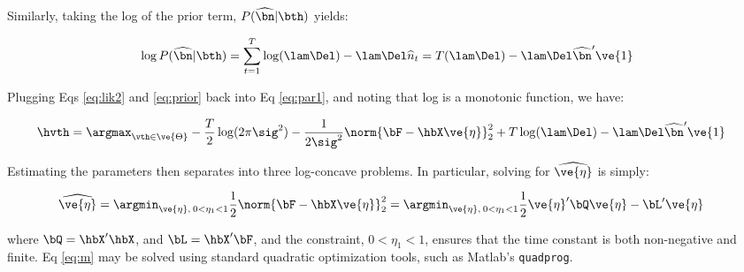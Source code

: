 \documentclass[12pt]{article}
\newcommand{\hC}{\widehat{C}}
\newcommand{\hn}{\widehat{n}}
\newcommand{\hnm}{\widehat{\bn}}
\newcommand{\hCm}{\widehat{\bC}}
\begin{document}
Similarly, taking the log of the prior term, $P(\hnm | \bth )$ yields:

\begin{align} \label{eq:prior}
\log P(\hnm | \bth) =  \sum _{t=1}^T \log(\lam \Del)  -\lam \Del \hn_t =T (\lam \Del) - \lam \Del \hnm' \ve{1} 
\end{align}

\noindent Plugging Eqs \eqref{eq:lik2} and \eqref{eq:prior} back into Eq \eqref{eq:par1}, and noting that log is a monotonic function, we have:



\begin{align} 
\hvth &=\argmax_{\vth \in \ve{\Theta}} - \frac{T}{2} \log (2\pi\sig^2) - \frac{1}{2\sig^2} \norm{\bF - \hbX \ve{\eta}}_2^2 + T \log (\lam \Del) - \lam \Del \hnm' \ve{1} \label{eq:par} 
\end{align}

\noindent %
Estimating the parameters then separates into three log-concave problems.  In particular, solving for $\widehat{\ve{\eta}}$ is simply:

\begin{align} 
\widehat{\ve{\eta}} &= \argmin_{\ve{\eta},\: 0< \eta_1<1} \frac{1}{2} \norm{\bF - \hbX \ve{\eta}}_2^2 
=  \argmin_{\ve{\eta},\: 0< \eta_1<1} \frac{1}{2} \ve{\eta}' \bQ  \ve{\eta} - \bL'  \ve{\eta} \label{eq:m} 
\end{align}

\noindent where $\bQ=\hbX' \hbX$, and $\bL=\hbX' \bF$, and the constraint, $0<\eta_1<1$, ensures that the time constant is both non-negative and finite.  Eq \eqref{eq:m} may be solved using standard quadratic optimization tools, such as Matlab's \texttt{quadprog}.  
\end{document}
